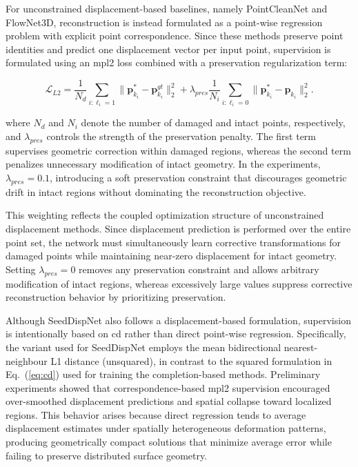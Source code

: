 For unconstrained displacement-based baselines, namely PointCleanNet and FlowNet3D, reconstruction is instead formulated as a point-wise regression problem with explicit point correspondence. Since these methods preserve point identities and predict one displacement vector per input point, supervision is formulated using an \ac{mpl2} loss combined with a preservation regularization term:


\begin{equation}
\mathcal{L}_{L2}
=
\frac{1}{N_d}
\sum_{i:\ell_i = 1}
\|
\mathbf{p}_{k_i}^{*}
-
\mathbf{p}_{k_i}^{gt}
\|_2^2
+
\lambda_{pres}
\frac{1}{N_i}
\sum_{i:\ell_i = 0}
\|
\mathbf{p}_{k_i}^{*}
-
\mathbf{p}_{k_i}
\|_2^2 .
\label{eq:l2_disp}
\end{equation}

where $N_d$ and $N_i$ denote the number of damaged and intact points, respectively, and $\lambda_{pres}$ controls the strength of the preservation penalty. The first term supervises geometric correction within damaged regions, whereas the second term penalizes unnecessary modification of intact geometry. In the experiments, $\lambda_{pres} = 0.1$, introducing a soft preservation constraint that discourages geometric drift in intact regions without dominating the reconstruction objective.

This weighting reflects the coupled optimization structure of unconstrained displacement methods. Since displacement prediction is performed over the entire point set, the network must simultaneously learn corrective transformations for damaged points while maintaining near-zero displacement for intact geometry. Setting $\lambda_{pres}=0$ removes any preservation constraint and allows arbitrary modification of intact regions, whereas excessively large values suppress corrective reconstruction behavior by prioritizing preservation.

Although SeedDispNet also follows a displacement-based formulation, supervision is intentionally based on \ac{cd} rather than direct point-wise regression. Specifically, the variant used for SeedDispNet employs the mean bidirectional nearest-neighbour L1 distance (unsquared), in contrast to the squared formulation in Eq.~(\ref{eq:cd}) used for training the completion-based methods. Preliminary experiments showed that correspondence-based \ac{mpl2} supervision encouraged over-smoothed displacement predictions and spatial collapse toward localized regions. This behavior arises because direct regression tends to average displacement estimates under spatially heterogeneous deformation patterns, producing geometrically compact solutions that minimize average error while failing to preserve distributed surface geometry.

